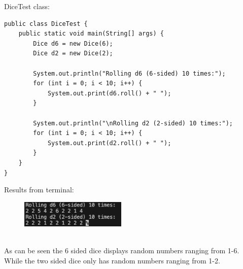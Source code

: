 \documentclass[a4paper,11pt]{article}
\begin{document}
DiceTest class: \begin{lstlisting}
public class DiceTest {
    public static void main(String[] args) {
        Dice d6 = new Dice(6);
        Dice d2 = new Dice(2);

        System.out.println("Rolling d6 (6-sided) 10 times:");
        for (int i = 0; i < 10; i++) {
            System.out.print(d6.roll() + " ");
        }

        System.out.println("\nRolling d2 (2-sided) 10 times:");
        for (int i = 0; i < 10; i++) {
            System.out.print(d2.roll() + " ");
        }
    }
}
\end{lstlisting}
Results from terminal:
\begin{figure}[h] 
    \centering
    \includegraphics[width=0.45\textwidth]{DiceTest.png}
    \label{fig:first}
\end{figure}\\
As can be seen the 6 sided dice displays random numbers ranging from 1-6. While the two sided dice only has random numbers ranging from 1-2.
\end{document}
